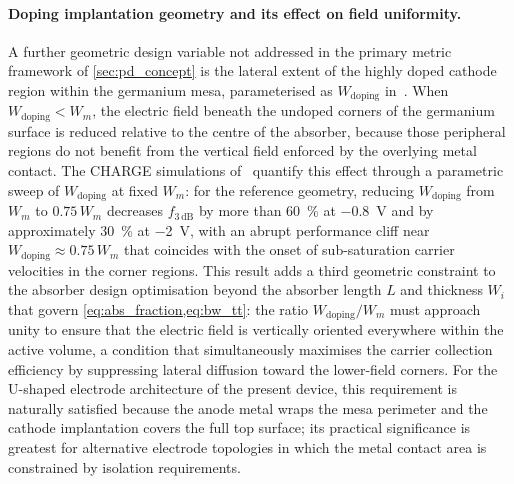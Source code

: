 \paragraph{Doping implantation geometry and its effect on field uniformity.}
A further geometric design variable not addressed in the primary metric
framework of \cref{sec:pd_concept} is the lateral extent of the highly doped
cathode region within the germanium mesa, parameterised as
$W_{\mathrm{doping}}$ in~\cite{Alasio2024}. When $W_{\mathrm{doping}} <
W_m$, the electric field beneath the undoped corners of the germanium surface is
reduced relative to the centre of the absorber, because those peripheral regions
do not benefit from the vertical field enforced by the overlying metal contact.
The CHARGE simulations of~\cite{Alasio2024} quantify this effect through a
parametric sweep of $W_{\mathrm{doping}}$ at fixed $W_m$: for the reference
geometry, reducing $W_{\mathrm{doping}}$ from $W_m$ to $0.75\,W_m$ decreases
$f_{3\,\mathrm{dB}}$ by more than \SI{60}{\percent} at \SI{-0.8}{\volt} and
by approximately \SI{30}{\percent} at \SI{-2}{\volt}, with an abrupt
performance cliff near $W_{\mathrm{doping}} \approx 0.75\,W_m$ that coincides
with the onset of sub-saturation carrier velocities in the corner regions.
This result adds a third geometric constraint to the absorber design
optimisation beyond the absorber length $L$ and thickness $W_i$ that govern
\cref{eq:abs_fraction,eq:bw_tt}: the ratio $W_{\mathrm{doping}}/W_m$ must
approach unity to ensure that the electric field is vertically oriented
everywhere within the active volume, a condition that simultaneously maximises
the carrier collection efficiency by suppressing lateral diffusion toward the
lower-field corners. For the U-shaped electrode architecture of the present
device, this requirement is naturally satisfied because the anode metal wraps
the mesa perimeter and the cathode implantation covers the full top surface;
its practical significance is greatest for alternative electrode topologies
in which the metal contact area is constrained by isolation requirements.

